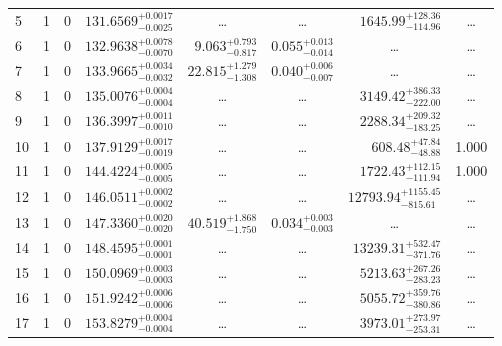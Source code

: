 \begin{table*}[!]
\begin{tabular}{llcrrlrc}
5 & 1 & 0 & $    131.6569_{-      0.0025}^{+      0.0017}$ & \multicolumn{1}{c}{\dots} & \multicolumn{1}{c}{\dots} & $     1645.99_{-      114.96}^{+      128.36}$ & \dots \\[1pt]
6 & 1 & 0 & $    132.9638_{-      0.0070}^{+      0.0078}$ & $       9.063_{-       0.817}^{+       0.793}$ & $       0.055_{-       0.014}^{+       0.013}$ & \multicolumn{1}{c}{\dots} & \dots \\[1pt]
7 & 1 & 0 & $    133.9665_{-      0.0032}^{+      0.0034}$ & $      22.815_{-       1.308}^{+       1.279}$ & $       0.040_{-       0.007}^{+       0.006}$ & \multicolumn{1}{c}{\dots} & \dots \\[1pt]
8 & 1 & 0 & $    135.0076_{-      0.0004}^{+      0.0004}$ & \multicolumn{1}{c}{\dots} & \multicolumn{1}{c}{\dots} & $     3149.42_{-      222.00}^{+      386.33}$ & \dots \\[1pt]
9 & 1 & 0 & $    136.3997_{-      0.0010}^{+      0.0011}$ & \multicolumn{1}{c}{\dots} & \multicolumn{1}{c}{\dots} & $     2288.34_{-      183.25}^{+      209.32}$ & \dots \\[1pt]
10 & 1 & 0 & $    137.9129_{-      0.0019}^{+      0.0017}$ & \multicolumn{1}{c}{\dots} & \multicolumn{1}{c}{\dots} & $      608.48_{-       48.88}^{+       47.84}$ & 1.000\\[1pt]

11 & 1 & 0 & $    144.4224_{-      0.0005}^{+      0.0005}$ & \multicolumn{1}{c}{\dots} & \multicolumn{1}{c}{\dots} & $     1722.43_{-      111.94}^{+      112.15}$ & 1.000\\[1pt]
12 & 1 & 0 & $    146.0511_{-      0.0002}^{+      0.0002}$ & \multicolumn{1}{c}{\dots} & \multicolumn{1}{c}{\dots} & $    12793.94_{-      815.61}^{+     1155.45}$ & \dots \\[1pt]
13 & 1 & 0 & $    147.3360_{-      0.0020}^{+      0.0020}$ & $      40.519_{-       1.750}^{+       1.868}$ & $       0.034_{-       0.003}^{+       0.003}$ & \multicolumn{1}{c}{\dots} & \dots \\[1pt]
14 & 1 & 0 & $    148.4595_{-      0.0001}^{+      0.0001}$ & \multicolumn{1}{c}{\dots} & \multicolumn{1}{c}{\dots} & $    13239.31_{-      371.76}^{+      532.47}$ & \dots \\[1pt]
15 & 1 & 0 & $    150.0969_{-      0.0003}^{+      0.0003}$ & \multicolumn{1}{c}{\dots} & \multicolumn{1}{c}{\dots} & $     5213.63_{-      283.23}^{+      267.26}$ & \dots \\[1pt]
16 & 1 & 0 & $    151.9242_{-      0.0006}^{+      0.0006}$ & \multicolumn{1}{c}{\dots} & \multicolumn{1}{c}{\dots} & $     5055.72_{-      380.86}^{+      359.76}$ & \dots \\[1pt]
17 & 1 & 0 & $    153.8279_{-      0.0004}^{+      0.0004}$ & \multicolumn{1}{c}{\dots} & \multicolumn{1}{c}{\dots} & $     3973.01_{-      253.31}^{+      273.97}$ & \dots \\[1pt]


\end{tabular}
\end{table*}
